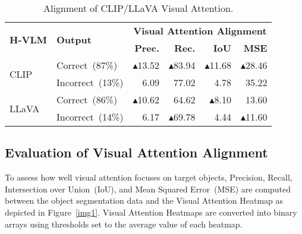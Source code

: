 \begin{table*}[h!]
\centering
\begin{tabular}{llrrrr}
\toprule
\multirow{2}{*}{\textbf{H-VLM}} & \multirow{2}{*}{\textbf{Output}} & \multicolumn{4}{c}{\textbf{Visual Attention Alignment}} \\ %
& & \textbf{Prec.} & \textbf{Rec.}  & \textbf{IoU}    & \textbf{MSE}   \\ 
\cmidrule(lr){1-6}
\multirow{2}{*}{CLIP}& Correct~(87\%)  &\ensuremath{\blacktriangle}13.52   & \ensuremath{\blacktriangle}83.94 & \ensuremath{\blacktriangle}11.68 & \ensuremath{\blacktriangle}28.46  \\
& Incorrect~(13\%) & 6.09   & 77.02 & 4.78 & 35.22 \\
\multirow{2}{*}{LLaVA}& Correct~(86\%)  & \ensuremath{\blacktriangle}10.62  & 64.62 & \ensuremath{\blacktriangle}8.10 & 13.60 \\ 
& Incorrect~(14\%) & 6.17   & \ensuremath{\blacktriangle}69.78 & 4.44 & \ensuremath{\blacktriangle}11.60 \\
\bottomrule
\end{tabular}
\caption{Alignment of CLIP/LLaVA Visual Attention.}
\label{table3}
\end{table*}

\subsection{Evaluation of Visual Attention Alignment}
To assess how well visual attention focuses on target objects, Precision, Recall, Intersection over Union~(IoU), and Mean Squared Error~(MSE) are computed between the object segmentation data and the Visual Attention Heatmap as depicted in Figure~\ref{img1}. 
Visual Attention Heatmaps are converted into binary arrays using thresholds set to the average value of each heatmap.


